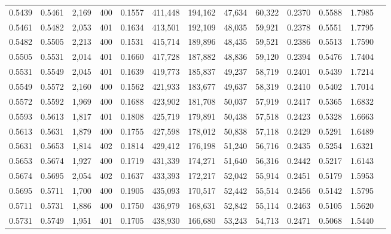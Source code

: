 \begin{tabular}{rrrrrrrrrrrrr}
0.5439 & 0.5461 & 2,169 & 400 &                                     0.1557 & 411,448 & 194,162 &  47,634 &  60,322 & 0.2370 & 0.5588 & 1.7985 \\
0.5461 & 0.5482 & 2,053 & 401 &                                     0.1634 & 413,501 & 192,109 &  48,035 &  59,921 & 0.2378 & 0.5551 & 1.7795 \\
0.5482 & 0.5505 & 2,213 & 400 &                                     0.1531 & 415,714 & 189,896 &  48,435 &  59,521 & 0.2386 & 0.5513 & 1.7590 \\
0.5505 & 0.5531 & 2,014 & 401 &                                     0.1660 & 417,728 & 187,882 &  48,836 &  59,120 & 0.2394 & 0.5476 & 1.7404 \\
0.5531 & 0.5549 & 2,045 & 401 &                                     0.1639 & 419,773 & 185,837 &  49,237 &  58,719 & 0.2401 & 0.5439 & 1.7214 \\
0.5549 & 0.5572 & 2,160 & 400 &                                     0.1562 & 421,933 & 183,677 &  49,637 &  58,319 & 0.2410 & 0.5402 & 1.7014 \\
0.5572 & 0.5592 & 1,969 & 400 &                                     0.1688 & 423,902 & 181,708 &  50,037 &  57,919 & 0.2417 & 0.5365 & 1.6832 \\
0.5593 & 0.5613 & 1,817 & 401 &                                     0.1808 & 425,719 & 179,891 &  50,438 &  57,518 & 0.2423 & 0.5328 & 1.6663 \\
0.5613 & 0.5631 & 1,879 & 400 &                                     0.1755 & 427,598 & 178,012 &  50,838 &  57,118 & 0.2429 & 0.5291 & 1.6489 \\
0.5631 & 0.5653 & 1,814 & 402 &                                     0.1814 & 429,412 & 176,198 &  51,240 &  56,716 & 0.2435 & 0.5254 & 1.6321 \\
0.5653 & 0.5674 & 1,927 & 400 &                                     0.1719 & 431,339 & 174,271 &  51,640 &  56,316 & 0.2442 & 0.5217 & 1.6143 \\
0.5674 & 0.5695 & 2,054 & 402 &                                     0.1637 & 433,393 & 172,217 &  52,042 &  55,914 & 0.2451 & 0.5179 & 1.5953 \\
0.5695 & 0.5711 & 1,700 & 400 &                                     0.1905 & 435,093 & 170,517 &  52,442 &  55,514 & 0.2456 & 0.5142 & 1.5795 \\
0.5711 & 0.5731 & 1,886 & 400 &                                     0.1750 & 436,979 & 168,631 &  52,842 &  55,114 & 0.2463 & 0.5105 & 1.5620 \\
0.5731 & 0.5749 & 1,951 & 401 &                                     0.1705 & 438,930 & 166,680 &  53,243 &  54,713 & 0.2471 & 0.5068 & 1.5440 \\

\end{tabular}
